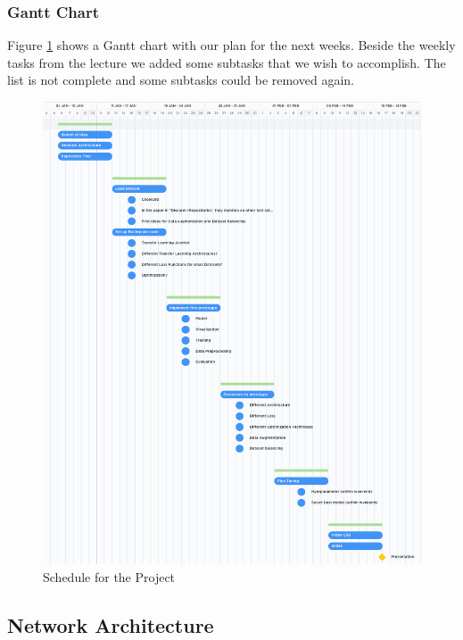 \documentclass{article}
\begin{document}
\subsubsection{Gantt Chart}
Figure \ref{fig:gant} shows a Gantt chart with our plan for the next weeks. Beside the weekly tasks from the lecture we added some subtasks that we wish to accomplish. The list is not complete and some subtasks could be removed again.

\begin{figure}[htp!]
    \centering
    \includegraphics[width=\textwidth]{gant.png}
    \caption{Schedule for the Project}
    \label{fig:gant}
\end{figure}

\subsection{Network Architecture}
\end{document}
